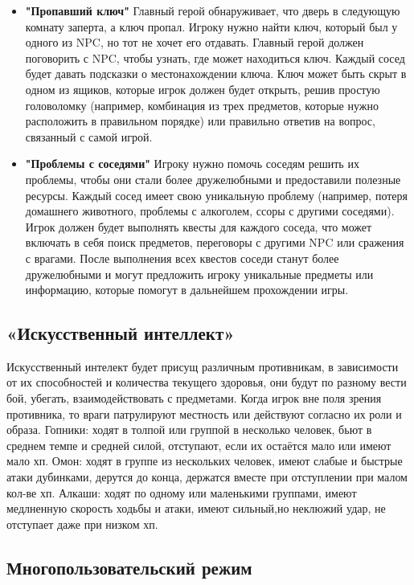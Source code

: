 \documentclass[12pt]{article}
\begin{document}
\begin{itemize}
    \item \textbf{"Пропавший ключ"} Главный герой обнаруживает, что дверь в следующую комнату заперта, а ключ пропал. Игроку нужно найти ключ, который был у одного из NPC, но тот не хочет его отдавать. Главный герой должен поговорить с NPC, чтобы узнать, где может находиться ключ. Каждый сосед будет давать подсказки о местонахождении ключа. Ключ может быть скрыт в одном из ящиков, которые игрок должен будет открыть, решив простую головоломку (например, комбинация из трех предметов, которые нужно расположить в правильном порядке) или правильно ответив на вопрос, связанный с самой игрой.
    \item \textbf{"Проблемы с соседями"} Игроку нужно помочь соседям решить их проблемы, чтобы они стали более дружелюбными и предоставили полезные ресурсы. Каждый сосед имеет свою уникальную проблему (например, потеря домашнего животного, проблемы с алкоголем, ссоры с другими соседями). Игрок должен будет выполнять квесты для каждого соседа, что может включать в себя поиск предметов, переговоры с другими NPC или сражения с врагами. После выполнения всех квестов соседи станут более дружелюбными и могут предложить игроку уникальные предметы или информацию, которые помогут в дальнейшем прохождении игры.
\end{itemize}


    \subsection{«Искусственный интеллект»}
            Искусственный интелект будет присущ различным противникам, в зависимости от их способностей и количества текущего здоровья, они будут по разному вести бой, убегать, взаимодействовать с предметами. Когда игрок вне поля зрения противника, то враги патрулируют местность или действуют согласно их роли и образа. Гопники: ходят в толпой или группой в несколько человек, бьют в среднем темпе и средней силой, отступают, если их остаётся мало или имеют мало хп. Омон: ходят в группе из нескольких человек, имеют слабые и быстрые атаки дубинками, дерутся до конца, держатся вместе при отступлении при малом кол-ве хп. Алкаши: ходят по одному или маленькими группами, имеют медлненную скорость ходьбы и атаки, имеют сильный,но неклюжий удар, не отступает даже при низком хп. 
    \subsection{Многопользовательский режим}
\end{document}
